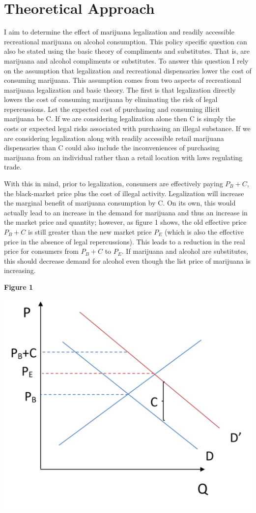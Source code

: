\documentclass[11pt]{article}
\begin{document}

\section{Theoretical Approach}

I aim to determine the effect of marijuana legalization and readily accessible recreational marijuana on alcohol consumption. This policy specific question can also be stated using the basic theory of compliments and substitutes. That is, are marijuana and alcohol compliments or substitutes.  
To answer this question  I rely on the assumption that legalization and recreational dispensaries lower the cost of consuming marijuana. This assumption comes from two aspects of recreational marijuana legalization and basic theory. The first is that legalization directly lowers the cost of consuming marijuana by eliminating the risk of legal repercussions. Let the expected cost of purchasing and consuming illicit marijuana be C. If we are considering legalization alone then C is simply the costs or expected legal risks associated with purchasing an illegal substance. If we are considering legalization along with readily accessible retail marijuana dispensaries than C could also include the inconveniences of purchasing marijuana from an individual rather than a retail location with laws regulating trade. 

With this in mind, prior to legalization, consumers are effectively paying $P_B + C$, the black-market price plus the cost of illegal activity. Legalization will increase the marginal benefit of marijuana consumption by C. On its own, this would actually lead to an increase in the demand for marijuana and thus an increase in the market price and quantity; however, as figure 1 shows, the old effective price $ P_B + C$ is still greater than the new market price $P_E$ (which is also the effective price in the absence of legal repercussions). This leads to a reduction in the real price for consumers from $ P_B + C$ to $P_E$. If marijuana and alcohol are substitutes, this should decrease demand for alcohol even though the list price of marijuana is increasing.\par
\begin{center}
	\centering
	
	\textbf{Figure 1}\par\medskip
	
	\includegraphics[width=.5\linewidth]{legal_dside.png}
	
\end{center}
\end{document}
